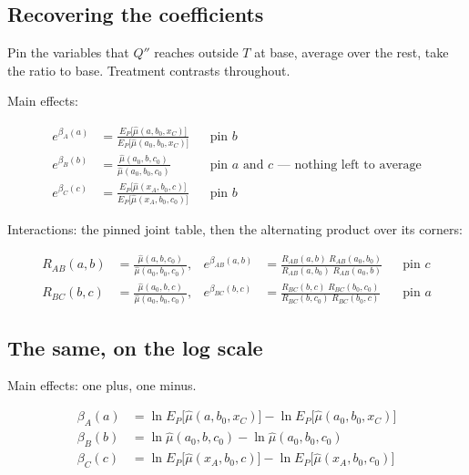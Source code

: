 \documentclass[
  letterpaper,
  DIV=11,
  numbers=noendperiod]{scrartcl}
\begin{document}
\subsection{Recovering the
coefficients}\label{recovering-the-coefficients}

Pin the variables that \(Q''\) reaches outside \(T\) at base, average
over the rest, take the ratio to base. Treatment contrasts throughout.

Main effects:

\[
\begin{aligned}
e^{\beta_A(a)} &= \frac{E_P\big[\hat{\mu}(a, b_0, x_C)\big]}{E_P\big[\hat{\mu}(a_0, b_0, x_C)\big]} &&\text{pin } b\\[6pt]
e^{\beta_B(b)} &= \frac{\hat{\mu}(a_0, b, c_0)}{\hat{\mu}(a_0, b_0, c_0)} &&\text{pin } a \text{ and } c \text{ — nothing left to average}\\[6pt]
e^{\beta_C(c)} &= \frac{E_P\big[\hat{\mu}(x_A, b_0, c)\big]}{E_P\big[\hat{\mu}(x_A, b_0, c_0)\big]} &&\text{pin } b
\end{aligned}
\]

Interactions: the pinned joint table, then the alternating product over
its corners:

\[
\begin{aligned}
R_{AB}(a, b) &= \frac{\hat{\mu}(a, b, c_0)}{\hat{\mu}(a_0, b_0, c_0)}, &
e^{\beta_{AB}(a, b)} &= \frac{R_{AB}(a, b)\; R_{AB}(a_0, b_0)}{R_{AB}(a, b_0)\; R_{AB}(a_0, b)} &&\text{pin } c\\[6pt]
R_{BC}(b, c) &= \frac{\hat{\mu}(a_0, b, c)}{\hat{\mu}(a_0, b_0, c_0)}, &
e^{\beta_{BC}(b, c)} &= \frac{R_{BC}(b, c)\; R_{BC}(b_0, c_0)}{R_{BC}(b, c_0)\; R_{BC}(b_0, c)} &&\text{pin } a
\end{aligned}
\]

\subsection{The same, on the log scale}\label{the-same-on-the-log-scale}

Main effects: one plus, one minus.

\[
\begin{aligned}
\beta_A(a) &= \ln E_P\big[\hat{\mu}(a, b_0, x_C)\big] - \ln E_P\big[\hat{\mu}(a_0, b_0, x_C)\big]\\[4pt]
\beta_B(b) &= \ln \hat{\mu}(a_0, b, c_0) - \ln \hat{\mu}(a_0, b_0, c_0)\\[4pt]
\beta_C(c) &= \ln E_P\big[\hat{\mu}(x_A, b_0, c)\big] - \ln E_P\big[\hat{\mu}(x_A, b_0, c_0)\big]
\end{aligned}
\]
\end{document}
